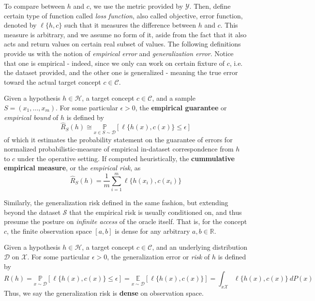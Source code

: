 To compare between $h$ and $c$, we use the metric provided by $\mathcal{Y}$. Then, define certain type of function called \textit{loss function}, also called objective, error function, denoted by $\ell\{h,c\}$ such that it measures the difference between $h$ and $c$. This measure is arbitrary, and we assume no form of it, aside from the fact that it also acts and return values on certain real subset of values. The following definitions provide us with the notion of \textit{empirical error} and \textit{generalization error}. Notice that one is empirical - indeed, since we only can work on certain fixture of $c$, i.e. the dataset provided, and the other one is generalized - meaning the true error toward the actual target concept $c\in\mathcal{C}$. 
\begin{definition} 
    Given a hypothesis $h\in \mathcal{H}$, a target concept $c\in \mathcal{C}$, and a sample $S=(x_{1},\dots,x_{m})$. For some particular $\epsilon>0$, the \textbf{empirical guarantee} or \textit{empirical bound} of $h$ is defined by\begin{equation}
        \hat{R}_{S}(h) \cong \underset{x\in S\sim\mathcal{D}}{\mathbb{P}} [\ell\{h(x),c(x)\}\leq \epsilon]
    \end{equation} 
    of which it estimates the probability statement on the guarantee of errors for normalized probabilistic-measure of empirical in-dataset correspondence from $h$ to $c$ under the operative setting. If computed heuristically, the \textbf{cummulative empirical measure}, or the \textit{empirical risk}, as
    \begin{equation}
        \hat{R}_{S}(h) = \frac{1}{m} \sum_{i=1}^{m} \ell\{h(x_i),c(x_i)\}
    \end{equation}
\end{definition}
Similarly, the generalization risk defined in the same fashion, but extending beyond the dataset $\mathcal{S}$ that the empirical risk is usually conditioned on, and thus presume the posture on \textit{infinite access} of the oracle itself. That is, for the concept $c$, the finite observation space $[a,b]$ is dense for any arbitrary $a,b\in\mathbb{R}$.  
\begin{definition}
    Given a hypothesis $h\in\mathcal{H}$, a target concept $c\in\mathcal{C}$, and an underlying distribution $\mathcal{D}$ on $\mathcal{X}$. For some particular $\epsilon>0$, the generalization error or \textit{risk} of $h$ is defined by
    \begin{equation}
        R(h) = \underset{x\sim\mathcal{D}}{\mathbb{P}} [\ell\{h(x),c(x)\}\leq \epsilon] = \underset{x\sim\mathcal{D}}{\mathbb{E}}[\ell\{h(x),c(x)\}] = \int_{x\mathcal{X}} \ell\{h(x),c(x)\} \: dP(x)
    \end{equation} 
    Thus, we say the generalization risk is \textbf{dense} on observation space. 
\end{definition}

